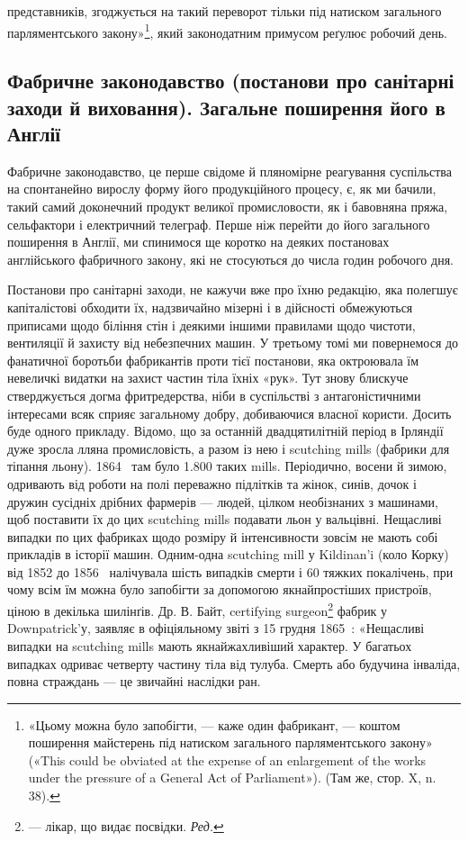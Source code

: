 \parcont{}  %
представників, згоджується на такий переворот тільки під натиском загального парляментського
закону»\footnote{
«Цьому можна було запобігти, — каже один фабрикант, — коштом
поширення майстерень під натиском загального парляментського закону»
(«This could be obviated at the expense of an enlargement of the works
under the pressure of a General Act of Parliament»). (Там же, стор. X,
n. 38).
}, який законодатним
примусом реґулює робочий день.

\subsection{Фабричне законодавство (постанови про санітарні заходи й виховання). Загальне поширення його в
Англії}

Фабричне законодавство, це перше свідоме й пляномірне реагування суспільства на спонтанейно вирослу
форму його продукційного процесу, є, як ми бачили, такий самий доконечний продукт великої
промисловости, як і бавовняна пряжа, сельфактори
і електричний телеграф. Перше ніж перейти до його загального
поширення в Англії, ми спинимося ще коротко на деяких постановах англійського фабричного закону, які
не стосуються до
числа годин робочого дня.

Постанови про санітарні заходи, не кажучи вже про їхню
редакцію, яка полегшує капіталістові обходити їх, надзвичайно
мізерні і в дійсності обмежуються приписами щодо біління стін
і деякими іншими правилами щодо чистоти, вентиляції й захисту
від небезпечних машин. У третьому томі ми повернемося до фанатичної боротьби фабрикантів проти тієї
постанови, яка октроювала їм невеличкі видатки на захист частин тіла їхніх «рук».
Тут знову блискуче стверджується догма фритредерства, ніби в
суспільстві з антагоністичними інтересами всяк сприяє загальному добру, добиваючися власної користи.
Досить буде одного
прикладу. Відомо, що за останній двадцятилітній період в Ірляндії дуже зросла лляна промисловість, а
разом із нею і scutching
mills (фабрики для тіпання льону). 1864~ там було \num{1.800} таких
mills. Періодично, восени й зимою, одривають від роботи на
полі переважно підлітків та жінок, синів, дочок і дружин сусідніх дрібних фармерів — людей, цілком
необізнаних з машинами,
щоб поставити їх до цих scutching mills подавати льон у вальцівні.
Нещасливі випадки по цих фабриках щодо розміру й інтенсивности зовсім не мають собі прикладів в
історії машин. Одним-одна
scutching mill у Kildinan’i (коло Корку) від 1852 до 1856~
налічувала шість випадків смерти і 60 тяжких покалічень, при
чому всім їм можна було запобігти за допомогою якнайпростіших пристроїв, ціною в декілька шилінґів.
Др. В. Байт, certifying
surgeon\footnote*{
— лікар, що видає посвідки. \emph{Ред.}
} фабрик у Downpatrick’у, заявляє в офіціяльному
звіті з 15 грудня 1865~: «Нещасливі випадки на scutching
mills мають якнайжахливіший характер. У багатьох випадках одриває четверту частину тіла від тулуба.
Смерть або будучина інваліда, повна страждань — це звичайні наслідки ран.
\parbreak{}  %
